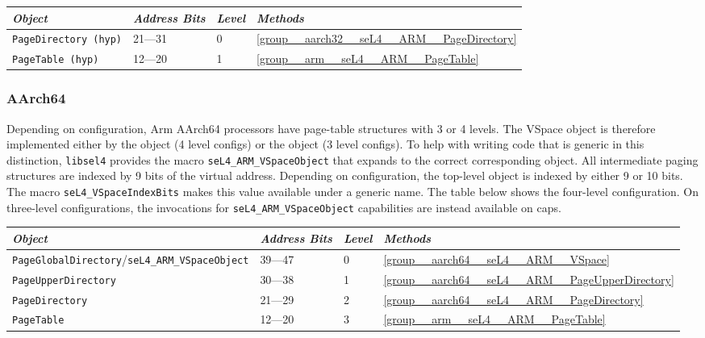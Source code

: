 \begin{tabularx}{\textwidth}{Xlll} \toprule
  \emph{Object}          & \emph{Address Bits} & \emph{Level} & \emph{Methods} \\ \midrule
  \texttt{PageDirectory (hyp)} & 21---31     & 0            & \autoref{group__aarch32__seL4__ARM__PageDirectory} \\
  \texttt{PageTable (hyp)}     & 12---20     & 1            & \autoref{group__arm__seL4__ARM__PageTable} \\
  \bottomrule
\end{tabularx}

\subsubsection{AArch64}

Depending on configuration, Arm AArch64 processors have page-table structures with 3 or 4 levels.
The VSpace object is therefore implemented either by the  object (4 level
configs) or the  object (3 level configs). To help with writing code that is
generic in this distinction, \texttt{libsel4} provides the macro \texttt{seL4\_ARM\_VSpaceObject}
that expands to the correct corresponding object. All intermediate paging structures are indexed by
9 bits of the virtual address. Depending on configuration, the top-level object is indexed by either
9 or 10 bits. The macro \texttt{seL4\_VSpaceIndexBits} makes this value available under a generic
name. The table below shows the four-level configuration. On three-level configurations, the
invocations for \texttt{seL4\_ARM\_VSpaceObject} capabilities are instead available on
 caps.

\begin{tabularx}{\textwidth}{Xlll} \toprule
\emph{Object}                    & \emph{Address Bits} & \emph{Level} & \emph{Methods} \\ \midrule
    \texttt{PageGlobalDirectory}/\texttt{seL4\_ARM\_VSpaceObject}
                                 & 39---47             & 0            & \autoref{group__aarch64__seL4__ARM__VSpace} \\
    \texttt{PageUpperDirectory}  & 30---38             & 1            & \autoref{group__aarch64__seL4__ARM__PageUpperDirectory} \\
\texttt{PageDirectory}           & 21---29             & 2            & \autoref{group__aarch64__seL4__ARM__PageDirectory} \\
\texttt{PageTable}               & 12---20             & 3            & \autoref{group__arm__seL4__ARM__PageTable} \\
\bottomrule
\end{tabularx}

